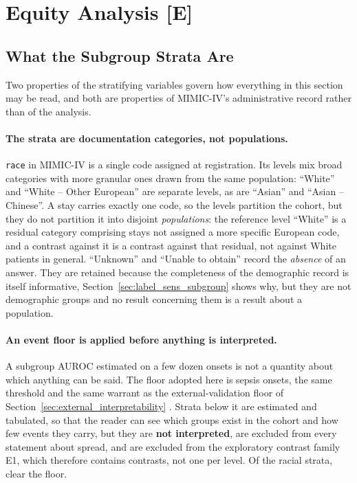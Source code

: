

\section{Equity Analysis \texorpdfstring{[E]}{[E]}}
\label{sec:equity}

\subsection{What the Subgroup Strata Are}
\label{sec:equity_strata}

Two properties of the stratifying variables govern how everything in this
section may be read, and both are properties of MIMIC-IV's administrative
record rather than of the analysis.

\paragraph{The strata are documentation categories, not populations.}
\texttt{race} in MIMIC-IV is a single code assigned at registration. Its levels
mix broad categories with more granular ones drawn from the same population:
``White'' and ``White -- Other European'' are separate levels, as are ``Asian''
and ``Asian -- Chinese''. A stay carries exactly one code, so the levels
partition the cohort, but they do not partition it into disjoint
\emph{populations}: the reference level ``White'' is a residual category
comprising stays not assigned a more specific European code, and a contrast
against it is a contrast against that residual, not against White patients in
general. ``Unknown'' and ``Unable to obtain'' record the \emph{absence} of an
answer. They are retained because the completeness of the demographic record is
itself informative, Section~\ref{sec:label_sens_subgroup} shows why, but
they are not demographic groups and no result concerning them is a result about
a population.

\paragraph{An event floor is applied before anything is interpreted.}
A subgroup AUROC estimated on a few dozen onsets is not a quantity about which
anything can be said. The floor adopted here is \pcMinSubgroupEvents{} sepsis
onsets, the same threshold and the same warrant as the external-validation
floor of Section~\ref{sec:external_interpretability}
\cite{riley2019sample, collins2024tripodai}. Strata below it are estimated and
tabulated, so that the reader can see which groups exist in the cohort and how
few events they carry, but they are \textbf{not interpreted}, are excluded from
every statement about spread, and are excluded from the exploratory contrast
family E1, which therefore contains \pcEquityNContrastsEOne{} contrasts, not
one per level. Of the racial strata, \pcNSubgroupsAboveFloor{} clear the floor.


